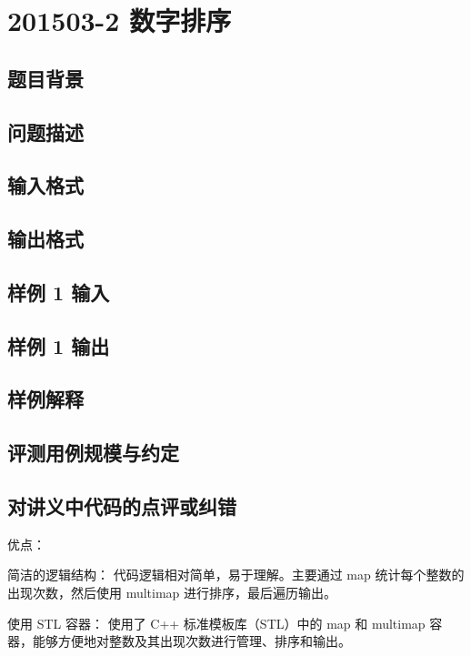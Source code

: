 \section{201503-2 数字排序}

\subsection{题目背景}

\subsection{问题描述}

\subsection{输入格式}

\subsection{输出格式}

\subsection{样例 1 输入}

\subsection{样例 1 输出}

\subsection{样例解释}

\subsection{评测用例规模与约定}

\subsection{对讲义中代码的点评或纠错}
 
优点：

简洁的逻辑结构： 代码逻辑相对简单，易于理解。主要通过 map 统计每个整数的出现次数，然后使用 multimap 进行排序，最后遍历输出。

使用 STL 容器： 使用了 C++ 标准模板库（STL）中的 map 和 multimap 容器，能够方便地对整数及其出现次数进行管理、排序和输出。

